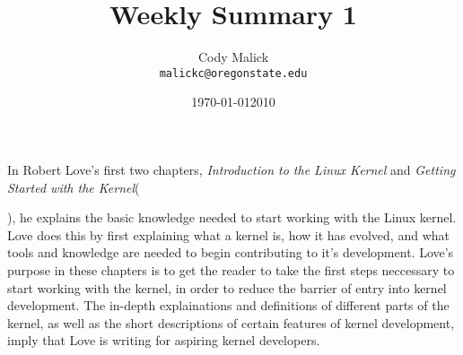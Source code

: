 \documentclass[10pt,letterpaper]{article}
\begin{document}
  \title{Weekly Summary 1}
  \author{Cody Malick\\
  \texttt{malickc@oregonstate.edu}}
  \date{\today}
  \maketitle

    In Robert Love's first two chapters, \textit{Introduction to the Linux
    Kernel} and \textit{Getting Started with the Kernel}(\date{2010}), he
    explains the basic knowledge needed to start working with the Linux kernel.
    Love does this by first explaining what a kernel is, how it has evolved, and
    what tools and knowledge are needed to begin contributing to it's
    development. Love's purpose in these chapters is to get the reader to take
    the first steps neccessary to start working with the kernel, in order to
    reduce the barrier of entry into kernel development. The in-depth
    explainations and definitions of different parts of the kernel, as well
    as the short descriptions of certain features of kernel development, imply
    that Love is writing for aspiring kernel developers.
\end{document}
